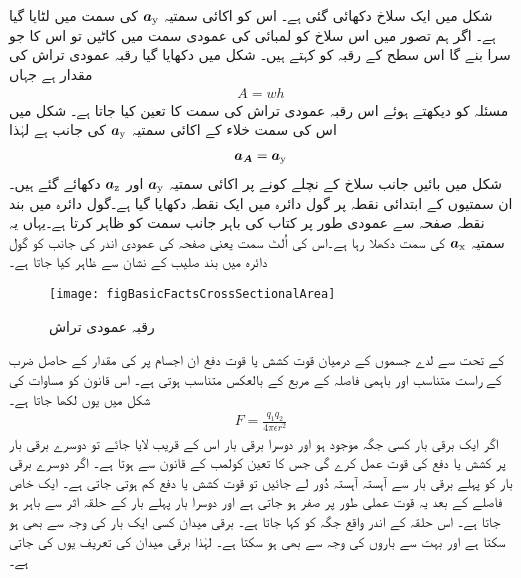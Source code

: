 شکل   میں ایک سلاخ دکھائی گئی ہے۔ اس کو اکائی سمتیہ ${\boldsymbol{a}}_{\textup{y}}$ کی سمت میں لٹایا گیا ہے۔ اگر ہم تصور میں اس سلاخ کو لمبائی کی عمودی سمت میں کاٹیں تو اس کا جو سرا بنے گا اس سطح کے رقبہ کو  کہتے ہیں۔ شکل میں دکھایا گیا رقبہ عمودی تراش  کی مقدار  ہے جہاں
\begin{align}
A=wh
\end{align}
مسئلہ کو دیکھتے ہوئے اس رقبہ عمودی تراش کی سمت کا تعین کیا جاتا ہے۔ شکل میں اس کی سمت   خلاء کے اکائی سمتیہ  ${\boldsymbol{a}}_{\textup{y}}$ کی جانب ہے لہٰذا
\begin{align}
{\ensuremath{{\boldsymbol{a_A}}}}={\boldsymbol{a}}_{\textup{y}}
\end{align}
شکل میں بائیں جانب سلاخ کے نچلے کونے پر اکائی سمتیہ  ${\boldsymbol{a}}_{\textup{y}}$  اور  ${\boldsymbol{a}}_{\textup{z}}$ دکھائے گئے ہیں۔ان سمتیوں کے ابتدائی نقطہ پر گول دائرہ میں ایک نقطہ دکھایا گیا ہے۔گول دائرہ میں بند نقطہ صفحہ سے عمودی طور پر کتاب کی باہر جانب سمت کو ظاہر کرتا ہے۔یہاں یہ سمتیہ  ${\boldsymbol{a}}_{\textup{x}}$ کی سمت دکھلا رہا ہے۔اس کی اُلٹ سمت یعنی صفحہ کی عمودی اندر کی جانب کو گول دائرہ میں بند صلیب کے نشان سے ظاہر کیا جاتا ہے۔
%
\begin{figure}
\centering
\texttt{[image: figBasicFactsCrossSectionalArea]}
\caption{رقبہ  عمودی تراش}
\label{شکل_حقائق_رقبہ_عمودی}
\end{figure}
%
 کے تحت  سے لدے جسموں کے درمیان قوت کشش یا قوت دفع ان اجسام پر  کی مقدار کے حاصل ضرب کے راست متناسب اور باہمی فاصلہ کے مربع کے بالعکس متناسب ہوتی ہے۔ اس قانون کو مساوات کی شکل میں یوں لکھا جاتا ہے۔
\begin{align}\label{مساوات_بنیادی_کولمب_کا_قانون}
F=\frac{q_1 q_2}{4 \pi \epsilon r^2}
\end{align}
	اگر ایک برقی بار کسی جگہ موجود ہو اور دوسرا برقی بار اس کے قریب لایا جائے تو دوسرے برقی بار پر کشش یا دفع کی قوت عمل کرے گی جس کا تعین کولمب کے قانون سے ہوتا ہے۔ اگر دوسرے برقی بار کو پہلے برقی بار سے آہستہ آہستہ دُور لے جائیں تو قوت کشش یا دفع کم ہوتی جاتی ہے۔ ایک خاص فاصلے کے بعد یہ قوت عملی طور پر صفر ہو جاتی ہے اور دوسرا بار پہلے بار کے حلقہ اثر سے باہر ہو جاتا ہے۔ اس حلقہ کے اندر واقع جگہ کو  کہا جاتا ہے۔ برقی میدان کسی ایک بار کی وجہ سے بھی ہو سکتا ہے اور بہت سے باروں کی وجہ سے بھی ہو سکتا ہے۔ لہٰذا برقی میدان کی تعریف یوں کی جاتی ہے۔


